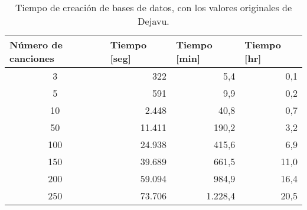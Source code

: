 \begin{table}[]
\centering
\caption{Tiempo de creación de bases de datos, con los valores originales de Dejavu.}
\label{tab:TiemposOriginales}
\begin{tabular}{@{}crrr@{}}
\toprule
\midrule
\multicolumn{1}{l}{Número de canciones} & \multicolumn{1}{l}{Tiempo {[}seg{]}} & \multicolumn{1}{l}{Tiempo {[}min{]}} & \multicolumn{1}{l}{Tiempo {[}hr{]}} \\ \midrule
3                                       & 322                                  & 5,4                                  & 0,1                                 \\
5                                       & 591                                  & 9,9                                  & 0,2                                 \\
10                                      & 2.448                                & 40,8                                 & 0,7                                 \\
50                                      & 11.411                               & 190,2                                & 3,2                                 \\
100                                     & 24.938                               & 415,6                                & 6,9                                 \\
150                                     & 39.689                               & 661,5                                & 11,0                                \\
200                                     & 59.094                               & 984,9                                & 16,4                                \\
250                                     & 73.706                               & 1.228,4                              & 20,5                                
\\ \midrule \bottomrule
\end{tabular}
\end{table}




